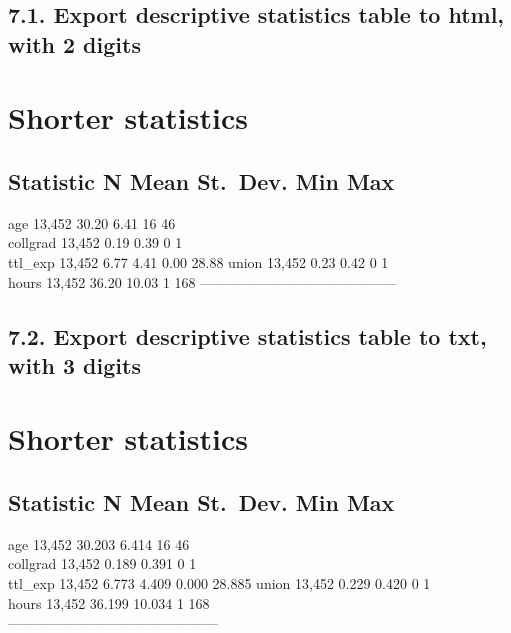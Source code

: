 \documentclass[
]{article}
\begin{document}
\hypertarget{export-descriptive-statistics-table-to-html-with-2-digits}{%
\subsection{7.1. Export descriptive statistics table to html, with 2
digits}\label{export-descriptive-statistics-table-to-html-with-2-digits}}

\hypertarget{shorter-statistics}{%
\section{Shorter statistics}\label{shorter-statistics}}

\hypertarget{statistic-n-mean-st.-dev.-min-max}{%
\subsection{Statistic N Mean St.~Dev. Min
Max}\label{statistic-n-mean-st.-dev.-min-max}}

age 13,452 30.20 6.41 16 46\\
collgrad 13,452 0.19 0.39 0 1\\
ttl\_exp 13,452 6.77 4.41 0.00 28.88 union 13,452 0.23 0.42 0 1\\
hours 13,452 36.20 10.03 1 168
------------------------------------------

\hypertarget{export-descriptive-statistics-table-to-txt-with-3-digits}{%
\subsection{7.2. Export descriptive statistics table to txt, with 3
digits}\label{export-descriptive-statistics-table-to-txt-with-3-digits}}

\hypertarget{shorter-statistics-1}{%
\section{Shorter statistics}\label{shorter-statistics-1}}

\hypertarget{statistic-n-mean-st.-dev.-min-max-1}{%
\subsection{Statistic N Mean St.~Dev. Min
Max}\label{statistic-n-mean-st.-dev.-min-max-1}}

age 13,452 30.203 6.414 16 46\\
collgrad 13,452 0.189 0.391 0 1\\
ttl\_exp 13,452 6.773 4.409 0.000 28.885 union 13,452 0.229 0.420 0 1\\
hours 13,452 36.199 10.034 1 168\\
---------------------------------------------
\end{document}
